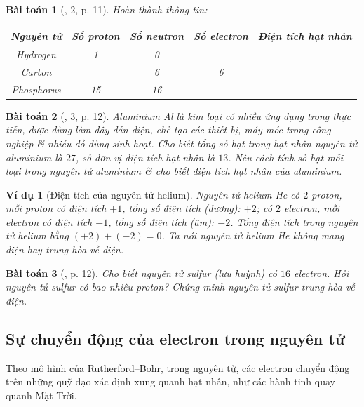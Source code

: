 \documentclass{article}
\newtheorem{baitoan}{Bài toán}
\newtheorem{vidu}{Ví dụ}
\begin{document}
\begin{baitoan}[\cite{SGK_KHTN_7_Canh_Dieu}, 2, p. 11]
	Hoàn thành thông tin:
	\begin{table}[H]
		\centering
		\begin{tabular}{|c|c|c|c|c|}
			\hline
			\textbf{Nguyên tử} & \textbf{Số proton} & \textbf{Số neutron} & \textbf{Số electron} & \textbf{Điện tích hạt nhân} \\
			\hline
			Hydrogen & 1 & 0 &  &  \\
			\hline
			Carbon &  & 6 & 6 &  \\
			\hline
			Phosphorus & 15 & 16 &  &  \\
			\hline
		\end{tabular}
	\end{table}
\end{baitoan}

\begin{baitoan}[\cite{SGK_KHTN_7_Canh_Dieu}, 3, p. 12]
	Aluminium \emph{Al} là kim loại có nhiều ứng dụng trong thực tiễn, được dùng làm dây dẫn điện, chế tạo các thiết bị, máy móc trong công nghiệp \& nhiều đồ dùng sinh hoạt. Cho biết tổng số hạt trong hạt nhân nguyên tử aluminium là $27$, số đơn vị điện tích hạt nhân là $13$. Nêu cách tính số hạt mỗi loại trong nguyên tử aluminium \& cho biết điện tích hạt nhân của aluminium.
\end{baitoan}

\begin{vidu}[Điện tích của nguyên tử helium]
	Nguyên tử helium \emph{He} có $2$ proton, mỗi proton có điện tích $+1$, tổng số điện tích (dương): $+2$; có $2$ electron, mỗi electron có điện tích $-1$, tổng số điện tích (âm): $-2$. Tổng điện tích trong nguyên tử helium bằng $(+2) + (-2) = 0$. Ta nói nguyên tử helium \emph{He} \emph{không mang điện} hay \emph{trung hòa về điện}.
\end{vidu}

\begin{baitoan}[\cite{SGK_KHTN_7_Canh_Dieu}, p. 12]
	Cho biết nguyên tử sulfur (lưu huỳnh) có $16$ electron. Hỏi nguyên tử sulfur có bao nhiêu proton? Chứng minh nguyên tử sulfur trung hòa về điện.
\end{baitoan}

\subsection{Sự chuyển động của electron trong nguyên tử}
Theo mô hình của Rutherford--Bohr, trong nguyên tử, các electron chuyển động trên những quỹ đạo xác định xung quanh hạt nhân, như các hành tinh quay quanh Mặt Trời.
\end{document}
